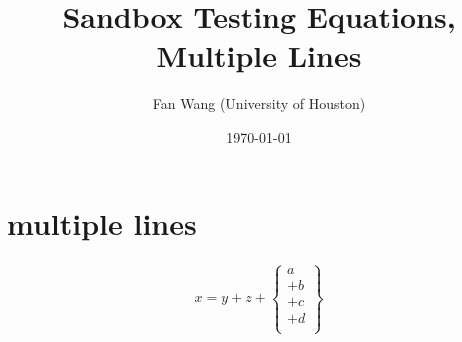 \documentclass[12pt,english]{article}
\title{Sandbox Testing Equations, Multiple Lines}
\author{Fan Wang (University of Houston)}
\date{\today}
\begin{document}
\maketitle

\section{multiple lines}

\begin{align}
    x = y + z + 
    \left\{
      \begin{array}{l}
            a \\
            + b \\
            + c \\
            + d \\
      \end{array}
    \right\}
\end{align}
\end{document}
